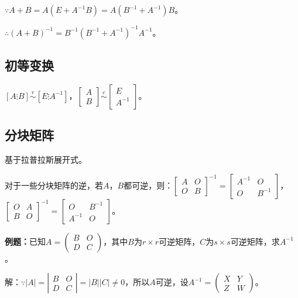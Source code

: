 \documentclass[UTF8, 12pt]{ctexart}
\begin{document}
$\because A+B=A(E+A^{-1}B)=A(B^{-1}+A^{-1})B$。

$\therefore (A+B)^{-1}=B^{-1}(B^{-1}+A^{-1})^{-1}A^{-1}$。

\subsection{初等变换}

$\left[A\vdots B\right]\overset{r}{\sim}\left[E\vdots A^{-1}\right]$，$\left[\begin{array}{c}
    A \\
    B
\end{array}\right]\overset{c}{\sim}\left[\begin{array}{c}
    E \\
    A^{-1}
\end{array}\right]$。

\subsection{分块矩阵}

基于拉普拉斯展开式。

对于一些分块矩阵的逆，若$A$，$B$都可逆，则：$\left[\begin{array}{cc}
    A & O \\
    O & B
\end{array}\right]^{-1}=\left[\begin{array}{cc}
    A^{-1} & O \\
    O & B^{-1}
\end{array}\right]$，$\left[\begin{array}{cc}
    O & A \\
    B & O
\end{array}\right]^{-1}=\left[\begin{array}{cc}
    O & B^{-1} \\
    A^{-1} & O
\end{array}\right]$。\medskip

\textbf{例题：}已知$A=\left(\begin{array}{cc}
    B & O \\
    D & C
\end{array}\right)$，其中$B$为$r\times r$可逆矩阵，$C$为$s\times s$可逆矩阵，求$A^{-1}$。

解：$\because\vert A\vert=\left|\begin{array}{cc}
    B & O \\
    D & C
\end{array}\right|=\vert B\vert\vert C\vert\neq0$，所以$A$可逆，设$A^{-1}=\left(\begin{array}{cc}
    X & Y \\
    Z & W
\end{array}\right)$。
\end{document}
